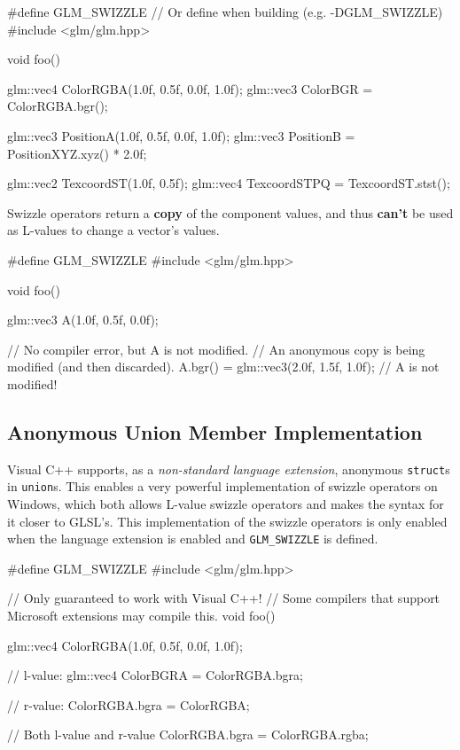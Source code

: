 \documentclass{scrartcl}
\numberwithin{figure}{subsection}
\begin{document}
\begin{cppcode}
#define GLM_SWIZZLE // Or define when building (e.g. -DGLM_SWIZZLE)
#include <glm/glm.hpp>

void foo()
{
  glm::vec4 ColorRGBA(1.0f, 0.5f, 0.0f, 1.0f);
  glm::vec3 ColorBGR = ColorRGBA.bgr();

  glm::vec3 PositionA(1.0f, 0.5f, 0.0f, 1.0f);
  glm::vec3 PositionB = PositionXYZ.xyz() * 2.0f;

  glm::vec2 TexcoordST(1.0f, 0.5f);
  glm::vec4 TexcoordSTPQ = TexcoordST.stst();
}
\end{cppcode}

Swizzle operators return a \textbf{copy} of the component values, and thus \textbf{can't} be used as L-values to change a vector's values.

\begin{cppcode}
#define GLM_SWIZZLE 
#include <glm/glm.hpp>

void foo()
{
  glm::vec3 A(1.0f, 0.5f, 0.0f);

  // No compiler error, but A is not modified.
  // An anonymous copy is being modified (and then discarded).
  A.bgr() = glm::vec3(2.0f, 1.5f, 1.0f); // A is not modified!
}
\end{cppcode}


\subsection{Anonymous Union Member Implementation}

Visual C++ supports, as a \emph{non-standard language extension}, anonymous \verb|struct|s in \verb|union|s. This enables a very powerful implementation of swizzle operators on Windows, which both allows L-value swizzle operators and makes the syntax for it closer to GLSL's.  This implementation of the swizzle operators is only enabled when the language extension is enabled and \verb|GLM_SWIZZLE| is defined.

\begin{cppcode}
#define GLM_SWIZZLE 
#include <glm/glm.hpp>

// Only guaranteed to work with Visual C++!
// Some compilers that support Microsoft extensions may compile this.
void foo()
{
  glm::vec4 ColorRGBA(1.0f, 0.5f, 0.0f, 1.0f);

  // l-value:
  glm::vec4 ColorBGRA = ColorRGBA.bgra;

  // r-value:
  ColorRGBA.bgra = ColorRGBA;

  // Both l-value and r-value
  ColorRGBA.bgra = ColorRGBA.rgba;
}
\end{cppcode}
\end{document}
